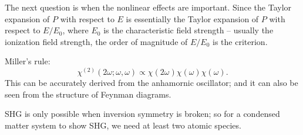 \documentclass[hyperref, a4paper]{article}
\newcommand*{\chitwo}{\chi^{(2)}}
\begin{document}
The next question is when the nonlinear effects are important.
Since the Taylor expansion of $P$ with respect to $E$ 
is essentially the Taylor expansion of $P$ with respect to $E / E_0$,
where $E_0$ is the characteristic field strength
-- usually the ionization field strength,
the order of magnitude of $E / E_0$ is the criterion.


Miller's rule:
\begin{equation}
    \chitwo(2\omega; \omega, \omega) \propto
    \chi(2 \omega) \chi(\omega) \chi(\omega).
\end{equation}
This can be accurately derived from the anhamornic oscillator;
and it can also be seen from the structure of Feynman diagrams.

SHG is only possible when inversion symmetry is broken; 
so for a condensed matter system to show SHG, 
we need at least two atomic species.
\end{document}

